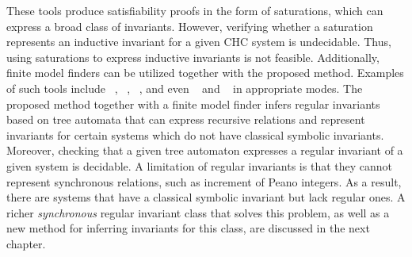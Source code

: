 These tools produce satisfiability proofs in the form of saturations, which can express a broad class of invariants. However, verifying whether a saturation represents an inductive invariant for a given CHC system is undecidable. Thus, using saturations to express inductive invariants is not feasible.
Additionally, finite model finders can be utilized together with the proposed method. Examples of such tools include \mace{}~\cite{https://doi.org/10.48550/arxiv.cs/0310055}, \kodkod{}~\cite{10.1007/978-3-540-71209-1_49}, \paradox{}~\cite{claessen2003new}, and even \cvc{}~\cite{reynolds2013finite} and \vampire{}~\cite{10.1007/978-3-319-40970-2_20} in appropriate modes. The proposed method together with a finite model finder infers regular invariants based on tree automata that can express recursive relations and represent invariants for certain systems which do not have classical symbolic invariants. Moreover, checking that a given tree automaton expresses a regular invariant of a given system is decidable.
A limitation of regular invariants is that they cannot represent synchronous relations, such as increment of Peano integers. As a result, there are systems that have a classical symbolic invariant but lack regular ones.
A richer \emph{synchronous} regular invariant class that solves this problem, as well as a new method for inferring invariants for this class, are discussed in the next chapter.
